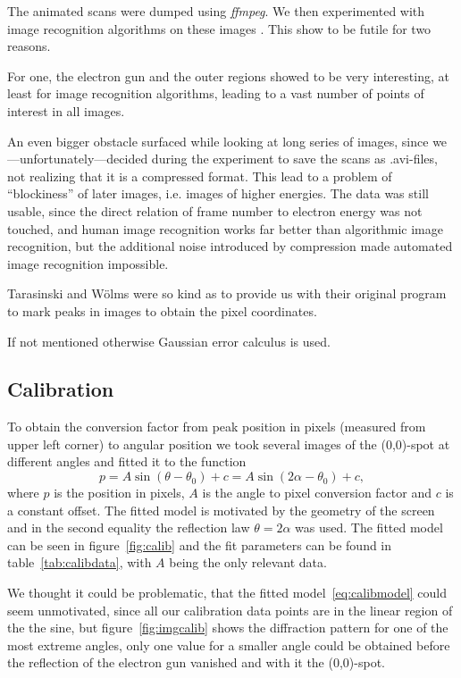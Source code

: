 \documentclass[a4paper,10pt]{scrartcl}
\begin{document}
The animated scans were dumped using \textit{ffmpeg}. We then experimented with image recognition algorithms on these images . This show to be futile for two reasons. 

For one, the electron gun and the outer regions showed to be very interesting, at least for image recognition algorithms, leading to a vast number of points of interest in all images. 

An even bigger obstacle surfaced while looking at long series of images, since we---unfortunately---decided during the experiment to save the scans as .avi-files, not realizing that it is a compressed format. This lead to a problem of ``blockiness'' of later images, i.e. images of higher energies. The data was still usable, since the direct relation of frame number to electron energy was not touched, and human image recognition works far better than algorithmic image recognition, but the additional noise introduced by compression made automated image recognition impossible.

Tarasinski and Wölms were so kind as to provide us with their original program to mark peaks in images to obtain the pixel coordinates.

If not mentioned otherwise Gaussian error calculus is used.

\subsection{Calibration}

To obtain the conversion factor from peak position in pixels (measured from upper left corner) to angular position we took several images of the (0,0)-spot at different angles and fitted it to the function
\begin{equation}
p = A \sin( \theta - \theta_{0} ) + c = A \sin( 2\alpha - \theta_{0} ) + c, \label{eq:calibmodel}
\end{equation}
where $p$ is the position in pixels, $A$ is the angle to pixel conversion factor and $c$ is a constant offset. The fitted model is motivated by the geometry of the screen and in the second equality the reflection law $\theta=2\alpha$ was used. The fitted model can be seen in figure~\ref{fig:calib} and the fit parameters can be found in table~\ref{tab:calibdata}, with $A$ being the only relevant data.

We thought it could be problematic, that the fitted model~\eqref{eq:calibmodel} could seem unmotivated, since all our calibration data points are in the linear region of the the sine, but figure~\ref{fig:imgcalib} shows the diffraction pattern for one of the most extreme angles, only one value for a smaller angle could be obtained before the reflection of the electron gun vanished and with it the (0,0)-spot. 
\end{document}
